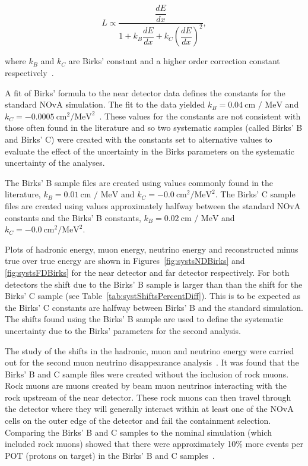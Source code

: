 \begin{equation}
L \propto \dfrac{ \dfrac{dE}{dx} }{ 1 + k_B\dfrac{dE}{dx} +
  k_C\left(\dfrac{dE}{dx}\right)^2 } ,
\end{equation}

where $k_B$ and $k_C$ are Birks' constant and a higher order
correction constant respectively~\cite{chou1952nature}.

A fit of Birks' formula to the near detector data defines
the constants for the standard NOvA simulation. The fit to the data
yielded $k_B=0.04~\text{cm / MeV}$  and
$k_C=-0.0005~\text{cm}^2 / \text{MeV}^2$~\cite{danBirksTuneCheck}. 
These values for the constants are not consistent with those often
found in the literature and so two systematic samples (called Birks' B
and Birks' C) were created with the constants set to alternative
values to evaluate the effect of the uncertainty in the Birks
parameters on the systematic uncertainty of the analyses. 

The Birks' B sample files are created using values commonly found in
the literature, 
$k_B=0.01~\text{cm / MeV}$  and $k_C=-0.0~\text{cm}^2/\text{MeV}^2$. 
The Birks' C sample files are created using values approximately
halfway between the standard NOvA constants and the Birks' B
constants, $k_B=0.02~\text{cm / MeV}$  and
$k_C=-0.0~\text{cm}^2/ \text{MeV}^2$. 

Plots of hadronic energy, muon energy, neutrino energy and
reconstructed minus true over true energy are shown in
Figures~\ref{fig:systsNDBirks} and \ref{fig:systsFDBirks}
for the near detector and far detector respectively. For both
detectors the shift due to the Birks' B sample is larger than than the
shift for the Birks' C sample (see
Table~\ref{tab:systShiftsPercentDiff}).
This is to be expected as the Birks' C constants are halfway
between Birks' B and the standard simulation. 
The shifts found using the Birks' B sample are used to define the
systematic uncertainty due to the Birks' parameters for the second
analysis.

The study of the shifts in the hadronic, muon and neutrino energy were
carried out for the second muon neutrino disappearance
analysis~\cite{LukeBirksSystAna}. It was found that the Birks' B and C
sample files were created without the inclusion of rock
muons.
Rock muons are muons created by beam muon neutrinos
interacting with the rock upstream of the near detector. These rock
muons can then travel through the detector where they will generally
interact within at least one of the NOvA cells on the outer edge of
the detector and fail the containment selection.
Comparing the Birks' B and C samples to the nominal simulation
(which included rock muons) showed that there were approximately 10\%
more 
events per POT (protons on target) in the Birks' B and C
samples~\cite{LukeBirksSystAna}.

